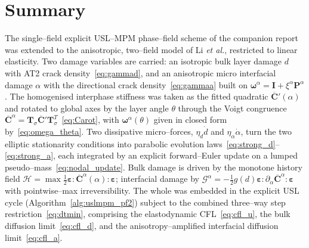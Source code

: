 \documentclass[12pt,a4paper]{article}
\newcommand{\bI}{\mathbf{I}}
\newcommand{\beps}{\boldsymbol{\varepsilon}}
\newcommand{\bP}{\mathbf{P}}
\newcommand{\bomega}{\boldsymbol{\omega}}
\newcommand{\Ca}{\overline{\mathbf{C}}^{\alpha}}     %
\newcommand{\Cp}{\overline{\mathbf{C}}'}             %
\newcommand{\Tsig}{\mathbf{T}_{\!\sigma}}            %
\begin{document}
	\section{Summary}\label{sec:summary}

	The single--field explicit USL--MPM phase--field scheme of the companion report
	was extended to the anisotropic, two--field model of Li \emph{et al.}, restricted
	to linear elasticity. Two damage variables are carried: an isotropic bulk layer
	damage $d$ with AT2 crack density~\eqref{eq:gammad}, and an anisotropic micro
	interfacial damage $\alpha$ with the directional crack density~\eqref{eq:gammaa}
	built on $\bomega^{\alpha}=\bI+\xi^{\alpha}\bP^{\alpha}$. The homogenised
	interphase stiffness was taken as the fitted quadratic $\Cp(\alpha)$ and rotated
	to global axes by the layer angle $\theta$ through the Voigt congruence
	$\Ca=\Tsig\Cp\Tsig^{T}$~\eqref{eq:Carot}, with $\bomega^{\alpha}(\theta)$ given in
	closed form by~\eqref{eq:omega_theta}. Two dissipative micro--forces,
	$\eta_d\dot d$ and $\eta_\alpha\dot\alpha$, turn the two elliptic stationarity
	conditions into parabolic evolution laws~\eqref{eq:strong_d}--\eqref{eq:strong_a},
	each integrated by an explicit forward--Euler update on a lumped
	pseudo--mass~\eqref{eq:nodal_update}. Bulk damage is driven by the monotone
	history field $\mathcal{H}=\max\tfrac12\beps:\Ca(\alpha):\beps$; interfacial
	damage by $\mathcal{G}^{\alpha}=-\tfrac12 g(d)\beps:\partial_\alpha\Ca:\beps$ with
	pointwise--max irreversibility. The whole was embedded in the explicit USL cycle
	(Algorithm~\ref{alg:uslmpm_pf2}) subject to the combined three--way step
	restriction~\eqref{eq:dtmin}, comprising the elastodynamic
	CFL~\eqref{eq:cfl_u}, the bulk diffusion limit~\eqref{eq:cfl_d}, and the
	anisotropy--amplified interfacial diffusion limit~\eqref{eq:cfl_a}.
\end{document}
